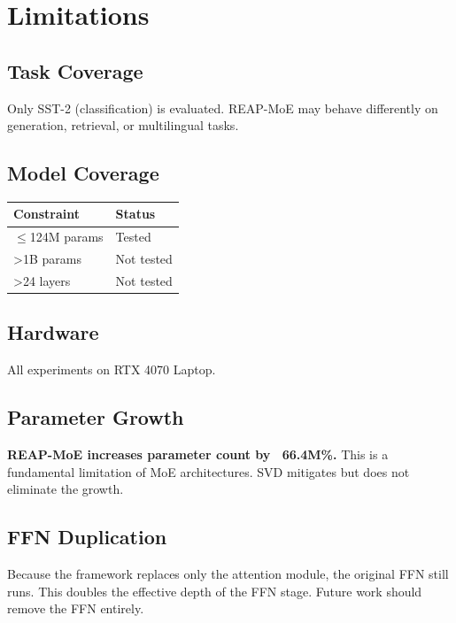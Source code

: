 \section{Limitations}

\subsection{Task Coverage}

Only SST-2 (classification) is evaluated. REAP-MoE may behave differently 
on generation, retrieval, or multilingual tasks.

\subsection{Model Coverage}

\begin{table}[H]
\centering
\small
\begin{tabular}{ll}
\toprule
\textbf{Constraint} & \textbf{Status} \\
\midrule
$\le$124M params & Tested \\
\textgreater{}1B params & Not tested \\
\textgreater{}24 layers & Not tested \\
\bottomrule
\end{tabular}
\end{table}

\subsection{Hardware}

All experiments on RTX 4070 Laptop.

\subsection{Parameter Growth}

\textbf{REAP-MoE increases parameter count by ~66.4M\%.} This is a 
fundamental limitation of MoE architectures. SVD mitigates but does not 
eliminate the growth.

\subsection{FFN Duplication}

Because the framework replaces only the attention module, the original FFN 
still runs. This doubles the effective depth of the FFN stage. Future work 
should remove the FFN entirely.

